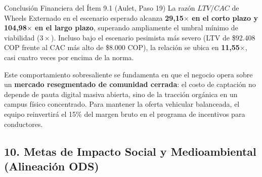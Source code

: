\documentclass[11pt,a4paper]{article}
\begin{document}
\begin{externadobox}{Conclusi\'on Financiera del \'Item 9.1 (Aulet, Paso 19)}
La raz\'on $LTV / CAC$ de Wheels Externado en el escenario esperado alcanza \textbf{29,15$\times$ en el corto plazo y 104,98$\times$ en el largo plazo}, superando ampliamente el umbral m\'inimo de viabilidad ($3\times$). Incluso bajo el escenario pesimista m\'as severo (LTV de \$92.408 COP frente al CAC m\'as alto de \$8.000 COP), la relaci\'on se ubica en \textbf{11,55$\times$}, casi cuatro veces por encima de la norma. 

Este comportamiento sobresaliente se fundamenta en que el negocio opera sobre un \textbf{mercado resegmentado de comunidad cerrada}: el costo de captaci\'on no depende de pauta digital masiva abierta, sino de la tracci\'on org\'anica en un campus f\'isico concentrado. Para mantener la oferta vehicular balanceada, el equipo reinvertir\'a el 15\% del margen bruto en el programa de incentivos para conductores.
\end{externadobox}

\subsection{10. Metas de Impacto Social y Medioambiental (Alineaci\'on ODS)}
\end{document}
